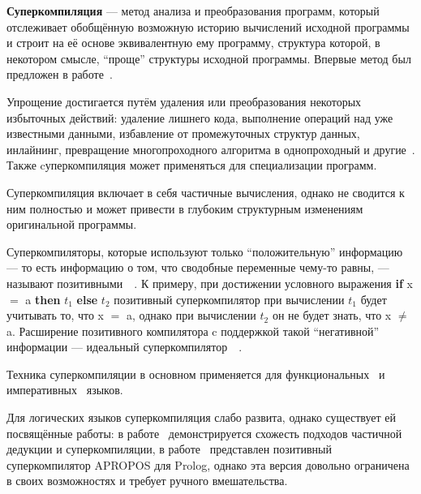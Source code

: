 {\bf Суперкомпиляция} --- метод анализа и преобразования программ,
который отслеживает обобщённую возможную историю вычислений исходной
программы и строит на её основе эквивалентную ему программу,
структура которой, в некотором смысле, ``проще'' структуры
исходной программы. Впервые метод был предложен в
работе~\cite{turchinSC}.

Упрощение достигается путём удаления или преобразования
некоторых избыточных действий: удаление лишнего кода, выполнение
операций над уже известными данными, избавление от промежуточных
структур данных, инлайнинг, превращение многопроходного алгоритма
в однопроходный и другие~\cite{scompRevisited}.
Также cуперкомпиляция может применяться для специализации программ.


Суперкомпиляция включает в себя частичные вычисления, однако не
сводится к ним полностью и может привести в глубоким структурным
изменениям оригинальной программы.

Суперкомпиляторы, которые используют только ``положительную''
информацию --- то есть информацию о том, что сводобные переменные
чему-то равны, --- называют
позитивными~~\cite{scPos}.
К примеру, при достижении условного выражения
{\bf if} x $=$ a {\bf then} $t_1$ {\bf else} $t_2$
позитивный суперкомпилятор при вычислении $t_1$ будет учитывать то,
что x $=$ a, однако при вычислении $t_2$ он не будет знать, что
x $\neq$ a.
Расширение позитивного компилятора c поддержкой такой ``негативной''
информации --- идеальный
суперкомпилятор~~\cite{scPerf}.

Техника суперкомпиляции в основном применяется для
функциональных~\cite{scHaskell, scPos} и императивных~\cite{scJava}
языков.

Для логических языков суперкомпиляция слабо развита, однако существует
ей посвящённые работы:
в работе~\cite{pdAndDriving} демонстрируется схожесть подходов частичной дедукции
и суперкомпиляции,
в работе~\cite{apropos} представлен позитивный суперкомпилятор APROPOS
для Prolog, однако эта версия довольно ограничена в своих возможностях
и требует ручного вмешательства.




